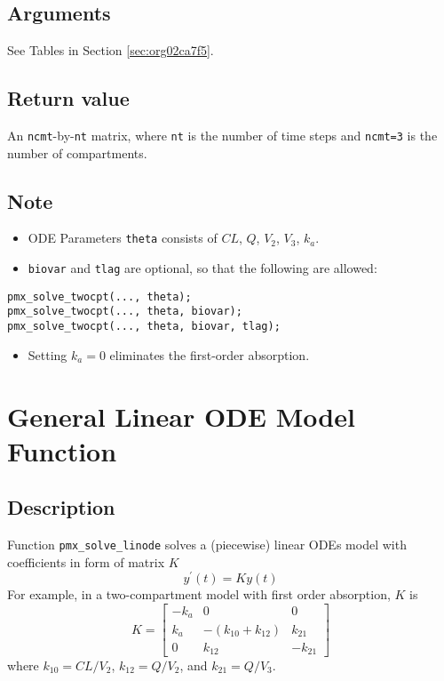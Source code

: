 \documentclass[12pt, reqno, oneside]{amsbook}
\numberwithin{equation}{chapter}
\numberwithin{figure}{chapter}
\numberwithin{table}{chapter}
\theoremstyle{remark}
\begin{document}
\subsection{Arguments}
\label{sec:org3243539}
See Tables in Section \ref{sec:org02ca7f5}.
\subsection{Return value}
\label{sec:orgae1f71d}
An \texttt{ncmt}-by-\texttt{nt} matrix, where \texttt{nt} is the number of time steps and \texttt{ncmt=3} is the number of compartments.

\subsection{Note}
\label{sec:orgb724980}
\begin{itemize}
\item ODE Parameters \texttt{theta} consists of \(CL\), \(Q\), \(V_2\), \(V_3\), \(k_a\).
\item \texttt{biovar} and \texttt{tlag} are optional, so that the following are allowed:
\end{itemize}
\begin{verbatim}
pmx_solve_twocpt(..., theta);
pmx_solve_twocpt(..., theta, biovar);
pmx_solve_twocpt(..., theta, biovar, tlag);
\end{verbatim}
\begin{itemize}
\item Setting \(k_a = 0\) eliminates the first-order absorption.
\end{itemize}

\section{General Linear ODE Model Function}
\label{sec:orgdba4f68}
\subsection{Description}
\label{sec:org56ce59e}
Function \texttt{pmx\_solve\_linode} solves a (piecewise) linear ODEs model with coefficients
in form of matrix \(K\)
\begin{equation}
y^\prime\left(t\right) = Ky\left(t\right)
\end{equation}
For example, in a two-compartment model with first order absorption, \(K\) is
\begin{equation}
  K = \left[\begin{array}{ccc}
              -k_a & 0 & 0 \\
              k_a & -\left(k_{10} + k_{12}\right) & k_{21} \\
              0 & k_{12} & -k_{21}
            \end{array}\right]
\end{equation}
where \(k_{10}=CL/V_2\), \(k_{12}=Q/V_2\), and \(k_{21}=Q/V_3\).
\end{document}
